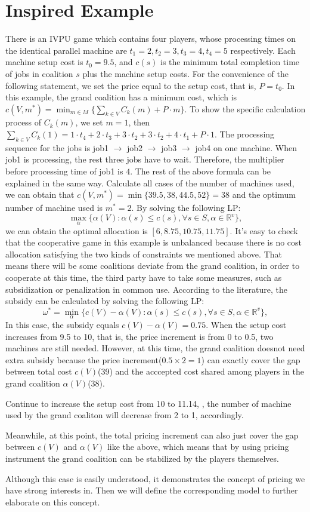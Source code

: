 \section*{Inspired Example}
There is an IVPU game which contains four players, whose processing times on the identical parallel machine are $t_1=2, t_2=3, t_3=4, t_4=5$ respectively. Each machine setup cost is $t_0=9.5$, and $c(s)$ is the minimum total completion time of jobs in coalition $s$ plus the machine setup costs.
For the convenience of the following statement, we set the price equal to the setup cost, that is, $P = t_0$.
In this example, the grand coalition has a minimum cost, which is $c(V,m^*) = \min_{m \in M} \{\sum_{k\in V}{C_k(m)}+ P\cdot m\}.$ To show the specific calculation process of $C_k(m)$, we set $m=1$, then $\sum_{k\in V}{C_k(1)} = 1 \cdot t_4 + 2\cdot t_3 + 3 \cdot t_2 + 3 \cdot t_2 + 4 \cdot t_1 + P \cdot 1.$
The processing sequence for the jobs is job1 $\to$ job2 $\to$ job3 $\to$ job4 on one machine. When job1 is processing, the rest three jobs have to wait. Therefore, the multiplier before processing time of job1 is $4$. The rest of the above formula can be explained in the same way.
Calculate all cases of the number of machines used, we can obtain that
$c(V,m^*) = \min\{39.5, 38, 44.5, 52\} = 38$ and the optimum number of machine used is $m^* = 2$.
By solving the following LP:
\[
  \mathop{\max}_{\alpha}\{\alpha(V): \alpha(s)\leq c(s),\forall s \in S, \alpha\in\mathbb{R}^{v}\},
\]
we can obtain the optimal allocation is $[6, 8.75, 10.75, 11.75]$.
It's easy to check that the cooperative game in this example is unbalanced because there is no cost allocation satisfying the two kinds of constraints we mentioned above. That means there will be some coalitions deviate from the grand coalition, in order to cooperate at this time, the third party have to take some measures, such as subsidization or penalization in common use.
According to the literature, the subsidy can be calculated by solving the following LP:
\[
  {\omega^*}=\mathop{\min}_{\alpha}\{c(V)-\alpha(V): \alpha(s)\leq c(s)
 ,\forall s \in S, \alpha\in\mathbb{R}^{v}\},
\]
In this case, the subsidy equals $c(V) - \alpha(V) = 0.75$.
When the setup cost increases from 9.5 to 10, that is, the price increment is from 0 to 0.5, two machines are still needed. However, at this time, the grand coalition doesnot need extra subsidy because the price increment($0.5\times 2 =1$) can exactly cover the gap between total cost $c(V)$(39) and the acccepted cost shared among players in the grand coalition $\alpha(V)$(38).

Continue to increase the setup cost from 10 to 11.14, , the number of machine used by the grand coaliton will decrease from 2 to 1, accordingly.

Meanwhile, at this point, the total pricing increment can also just cover the gap between $c(V)$ and $\alpha(V)$ like the above, which means that by using pricing instrument the grand coalition can be stabilized by the players themselves.

Although this case is easily understood, it demonstrates the concept of pricing we have strong interests in. Then we will define the corresponding model to further elaborate on this concept.
